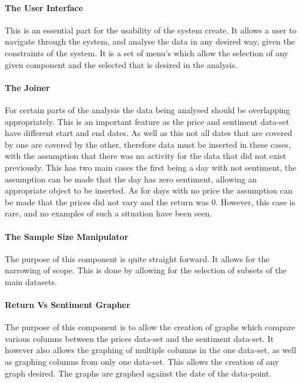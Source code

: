 \paragraph{The User Interface}

This is an essential part for the usability of the system create. It allows a user to navigate through the system, and analyse the data in any desired way, given the constraints of the system. It is a set of menu's which allow the selection of any given component and the selected that is desired in the analysis.

\paragraph{The Joiner}

For certain parts of the analysis the data being analysed should be overlapping appropriately. This is an important feature as the price and sentiment data-set have different start and end dates. As well as this not all dates that are covered by one are covered by the other, therefore data must be inserted in these cases, with the assumption that there was no activity for the data that did not exist previously. This has two main cases the first being a day with not sentiment, the assumption can be made that the day has zero sentiment, allowing an appropriate object to be inserted. As for days with no price the assumption can be made that the prices did not vary and the return was 0. However, this case is rare, and no examples of such a situation have been seen.

\paragraph{The Sample Size Manipulator}

The purpose of this component is quite straight forward. It allows for the narrowing of scope. This is done by allowing for the selection of subsets of the main datasets.

\paragraph{Return Vs Sentiment Grapher}

The purpose of this component is to allow the creation of graphs which compare various columns between the prices data-set and the sentiment data-set. It however also allows the graphing of multiple columns in the one data-set, as well as graphing columns from only one data-set. This allows the creation of any graph desired. The graphs are graphed against the date of the data-point.

